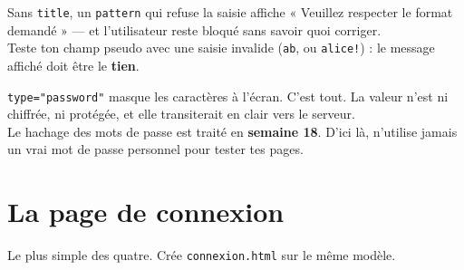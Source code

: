 \documentclass[a4paper,11pt]{article}
\begin{document}
\begin{tcolorbox}[attention, title={Le \texttt{title} n'est pas facultatif}]
Sans \texttt{title}, un \texttt{pattern} qui refuse la saisie affiche « Veuillez respecter le format demandé » --- et l'utilisateur reste bloqué sans savoir quoi corriger.\\[4pt]
Teste ton champ pseudo avec une saisie invalide (\texttt{ab}, ou \texttt{alice!}) : le message affiché doit être le \textbf{tien}.
\end{tcolorbox}

\begin{tcolorbox}[interdit, title={Aucun mot de passe n'est protégé aujourd'hui}]
\texttt{type="password"} masque les caractères à l'écran. C'est tout. La valeur n'est ni chiffrée, ni protégée, et elle transiterait en clair vers le serveur.\\[4pt]
Le hachage des mots de passe est traité en \textbf{semaine 18}. D'ici là, n'utilise jamais un vrai mot de passe personnel pour tester tes pages.
\end{tcolorbox}

\section{La page de connexion}

Le plus simple des quatre. Crée \texttt{connexion.html} sur le même modèle.
\end{document}

